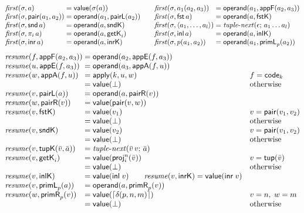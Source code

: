 \documentclass[10pt]{article}
\theoremstyle{acmplain}
\newcommand{\key}[1]{\mathsf{#1}}
\newcommand{\inl}{\key{inl}\,}
\newcommand{\inr}{\key{inr}\,}
\newcommand{\tuple}[1]{\langle #1 \rangle}
\newcommand{\prj}[1]{\pi_{#1}\,}
\newcommand{\pair}[2]{\key{pair}(#1, #2)}
\newcommand{\FST}{\key{fst}\,}
\newcommand{\SND}{\key{snd}\,}
\newcommand{\prim}[3]{#1(#2, #3)}
\newcommand{\res}[1]{\lceil #1 \rceil}
\newcommand{\tupV}[1]{\key{tup}(#1)}
\newcommand{\pairV}[2]{\key{pair}(#1, #2)}
\newcommand{\codeV}[1]{\key{code}_{#1}}
\newcommand{\inlV}{\key{inl}\;}
\newcommand{\inrV}{\key{inr}\;}
\newcommand{\tnext}{\mathit{tuple\text{-}next}}
\begin{document}
\[
\begin{array}{@{}l@{\;=\;}l@{\qquad}l@{\;=\;}l@{}}
  \mathit{first}(\sigma, a) & \key{value}(\sigma(a)) &
  \mathit{first}(\sigma, a_1(a_2, a_3)) & \key{operand}(a_1, \key{appF}(a_2, a_3)) \\
  \mathit{first}(\sigma, \pair{a_1}{a_2}) & \key{operand}(a_1, \key{pairL}(a_2)) &
  \mathit{first}(\sigma, \FST a) & \key{operand}(a, \key{fstK}) \\
  \mathit{first}(\sigma, \SND a) & \key{operand}(a, \key{sndK}) &
  \mathit{first}(\sigma, \tuple{a_1, \ldots, a_l}) & \tnext(\epsilon;\, a_1 \ldots a_l) \\
  \mathit{first}(\sigma, \prj{i} a) & \key{operand}(a, \key{getK}_i) &
  \mathit{first}(\sigma, \inl a) & \key{operand}(a, \key{inlK}) \\
  \mathit{first}(\sigma, \inr a) & \key{operand}(a, \key{inrK}) &
  \mathit{first}(\sigma, \prim{p}{a_1}{a_2}) & \key{operand}(a_1, \key{primL}_p(a_2))
\end{array}
\]
\[
\begin{array}{@{}l@{\;=\;}l@{\quad}l@{}}
  \mathit{resume}(f, \key{appF}(a_2, a_3)) & \key{operand}(a_2, \key{appE}(f, a_3)) \\
  \mathit{resume}(u, \key{appE}(f, a_3)) & \key{operand}(a_3, \key{appA}(f, u)) \\
  \mathit{resume}(w, \key{appA}(f, u)) & \key{apply}(k, u, w) & f = \codeV{k} \\
  & \key{value}(\bot) & \text{otherwise} \\
  \mathit{resume}(v, \key{pairL}(a)) & \key{operand}(a, \key{pairR}(v)) \\
  \mathit{resume}(w, \key{pairR}(v)) & \key{value}(\pairV{v}{w}) \\
  \mathit{resume}(v, \key{fstK}) & \key{value}(v_1) & v = \pairV{v_1}{v_2} \\
  & \key{value}(\bot) & \text{otherwise} \\
  \mathit{resume}(v, \key{sndK}) & \key{value}(v_2) & v = \pairV{v_1}{v_2} \\
  & \key{value}(\bot) & \text{otherwise} \\
  \mathit{resume}(v, \key{tupK}(\bar{v}, \bar{a})) & \tnext(\bar{v}\,v;\, \bar{a}) \\
  \mathit{resume}(v, \key{getK}_i) & \key{value}(\key{proj}^n_i(\bar{v})) & v = \tupV{\bar{v}} \\
  & \key{value}(\bot) & \text{otherwise} \\
  \mathit{resume}(v, \key{inlK}) & \key{value}(\inlV v) \qquad
  \mathit{resume}(v, \key{inrK}) = \key{value}(\inrV v) \\
  \mathit{resume}(v, \key{primL}_p(a)) & \key{operand}(a, \key{primR}_p(v)) \\
  \mathit{resume}(w, \key{primR}_p(v)) & \key{value}(\res{\delta(p, n, m)}) & v = n,\; w = m \\
  & \key{value}(\bot) & \text{otherwise}
\end{array}
\]
\end{document}
